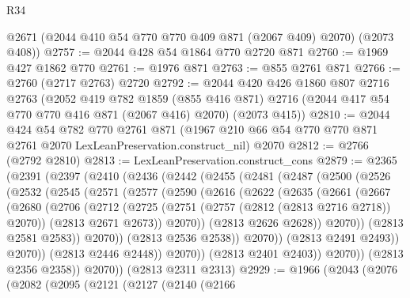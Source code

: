 \begin{lexlean}{R34}
\begin{coremodule}
      @2671
      (@2044 @410 @54 @770 @770 @409 @871 (@2067 @409) @2070)
      (@2073 @408))
@2757 := @2044 @428 @54 @1864 @770 @2720 @871
@2760 := @1969 @427 @1862 @770
@2761 := @1976 @871
@2763 := @855 @2761 @871
@2766 := @2760 (@2717 @2763) @2720
@2792 := @2044
    @420
    @426
    @1860
    @807
    @2716
    @2763
    (@2052
      @419
      @782
      @1859
      (@855 @416 @871)
      @2716
      (@2044 @417 @54 @770 @770 @416 @871 (@2067 @416) @2070)
      (@2073 @415))
@2810 := @2044
    @424
    @54
    @782
    @770
    @2761
    @871
    (@1967 @210 @66 @54 @770 @770 @871 @2761 @2070 LexLeanPreservation.construct_nil)
    @2070
@2812 := @2766 (@2792 @2810)
@2813 := LexLeanPreservation.construct_cons
@2879 := @2365
    (@2391
      (@2397
        (@2410
          (@2436
            (@2442
              (@2455
                (@2481
                  (@2487
                    (@2500
                      (@2526
                        (@2532
                          (@2545
                            (@2571
                              (@2577
                                (@2590
                                  (@2616
                                    (@2622
                                      (@2635
                                        (@2661
                                          (@2667
                                            (@2680
                                              (@2706
                                                (@2712
                                                  (@2725
                                                    (@2751
                                                      (@2757 (@2812 (@2813 @2716 @2718)) @2070))
                                                    (@2813 @2671 @2673))
                                                  @2070))
                                              (@2813 @2626 @2628))
                                            @2070))
                                        (@2813 @2581 @2583))
                                      @2070))
                                  (@2813 @2536 @2538))
                                @2070))
                            (@2813 @2491 @2493))
                          @2070))
                      (@2813 @2446 @2448))
                    @2070))
                (@2813 @2401 @2403))
              @2070))
          (@2813 @2356 @2358))
        @2070))
    (@2813 @2311 @2313)
@2929 := @1966
    (@2043
      (@2076
        (@2082
          (@2095
            (@2121
              (@2127
                (@2140
                  (@2166

\end{coremodule}
\end{lexlean}
